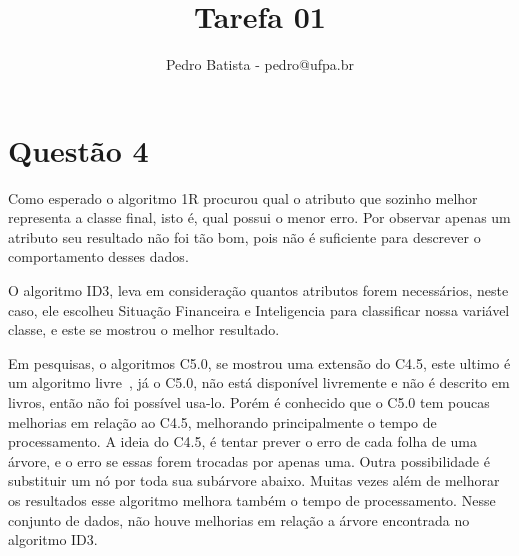 \documentclass[a4paper]{article}
\title{Tarefa 01}
\author{Pedro Batista - pedro@ufpa.br}
\begin{document}
\maketitle

\section{Questão 4}
Como esperado o algoritmo 1R procurou qual o atributo
que sozinho melhor representa a classe final, isto é,
qual possui o menor erro. Por observar apenas um atributo
seu resultado não foi tão bom, pois não é suficiente
para descrever o comportamento desses dados.

O algoritmo ID3, leva em consideração quantos atributos
forem necessários, neste caso, ele escolheu Situação
Financeira e Inteligencia para classificar nossa variável
classe, e este se mostrou o melhor resultado.

Em pesquisas, o algoritmos C5.0, se mostrou uma extensão
do C4.5, este ultimo é um algoritmo livre~\cite{data}, já o C5.0, não 
está disponível livremente e não é descrito em livros, então
não foi possível usa-lo. Porém é conhecido que o C5.0 tem
poucas melhorias em relação ao C4.5, melhorando principalmente
o tempo de processamento. A ideia do C4.5, é
tentar prever o erro de cada folha de uma árvore, e o erro se essas
forem trocadas por apenas uma. Outra possibilidade é substituir 
um nó por toda sua subárvore abaixo. Muitas vezes
além de melhorar os resultados esse algoritmo melhora também
o tempo de processamento. Nesse conjunto de dados, não houve melhorias
em relação a árvore encontrada no algoritmo ID3.



 
\end{document}
